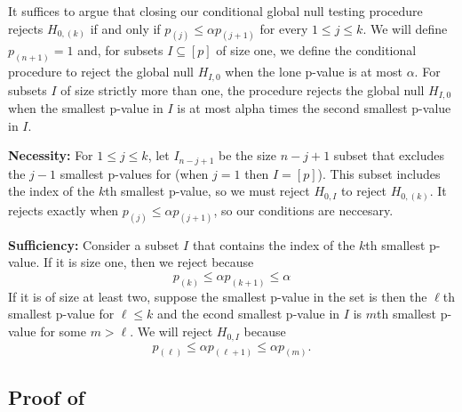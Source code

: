 \documentclass{article}
\begin{document}
\begin{appendix}
It suffices to argue that closing our conditional global null testing procedure rejects $H_{0, (k)}$ if and only if $p_{(j)} \leq \alpha p_{(j + 1)} $ for every $1 \leq j \leq k$. We will define $p_{(n+1)} = 1$ and, for subsets $I \subseteq [p]$ of size one, we define the conditional procedure to reject the global null $H_{I, 0}$ when the lone p-value is at most $\alpha$. For subsets $I$ of size strictly more than one, the procedure rejects the global null $H_{I, 0}$ when the smallest p-value in $I$ is at most alpha times the second smallest p-value in $I$. \newline 

\noindent \textbf{Necessity: } For $1 \leq j \leq k$, let $I_{n-j + 1}$ be the size $n - j + 1$ subset that excludes the $j - 1$ smallest p-values for (when $j = 1$ then $I = [p]$). This subset includes the index of the $k$th smallest p-value, so we must reject $H_{0, I}$ to reject $H_{0, (k)}$. It rejects exactly when $p_{(j)} \leq \alpha p_{(j + 1)}$, so our conditions are neccesary. \newline 

\noindent \textbf{Sufficiency: } Consider a subset $I$ that contains the index of the $k$th smallest p-value. If it is size one, then we reject because
\begin{equation*}
    p_{(k)} \leq \alpha p_{(k+1)} \leq \alpha 
\end{equation*}
If it is of size at least two, suppose the smallest p-value in the set is then the $\ell$th smallest p-value for $\ell \leq k$ and the econd smallest p-value in $I$ is $m$th smallest p-value for some $m > \ell$. We will reject $H_{0, I}$ because 
\begin{equation*}
    p_{(\ell)} \leq \alpha p_{(\ell + 1)} \leq \alpha p_{(m)}.
\end{equation*}
\fi

\subsection{Proof of }
\label{sec:hyb_proof_appdx}


\end{appendix}
\end{document}
